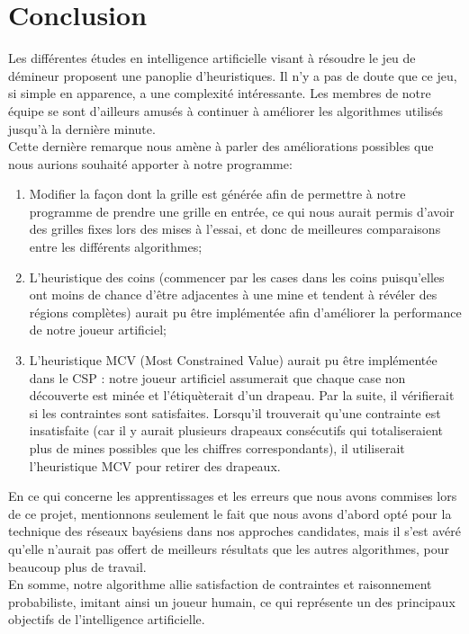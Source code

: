 \documentclass{article}
\begin{document}
\section{Conclusion}
Les différentes études en intelligence artificielle visant à résoudre le jeu de démineur 
proposent une panoplie d’heuristiques. Il n’y a pas de doute que ce jeu, si simple en apparence, 
a une complexité intéressante. Les membres de notre équipe se sont d’ailleurs amusés à continuer 
à améliorer les algorithmes utilisés jusqu’à la dernière minute. \\

Cette dernière remarque nous amène à parler des améliorations possibles que nous aurions souhaité apporter à notre programme:
\begin{enumerate}
        \item Modifier la façon dont la grille est générée afin de permettre à notre programme 
              de prendre une grille en entrée, ce qui nous aurait permis d’avoir des grilles fixes 
              lors des mises à l’essai, et donc de meilleures comparaisons entre les différents algorithmes;
        \item L’heuristique des coins (commencer par les cases dans les coins puisqu’elles ont 
              moins de chance d’être adjacentes à une mine et tendent à révéler des régions complètes) 
              aurait pu être implémentée afin d’améliorer la performance de notre joueur artificiel;
        \item L’heuristique MCV (Most Constrained Value) aurait pu être implémentée dans le CSP : notre joueur 
              artificiel assumerait que chaque case non découverte est minée et l’étiquèterait d’un drapeau. 
              Par la suite, il vérifierait si les contraintes sont satisfaites. Lorsqu’il trouverait qu’une 
              contrainte est insatisfaite (car il y aurait plusieurs drapeaux consécutifs qui totaliseraient 
              plus de mines possibles que les chiffres correspondants), il utiliserait l’heuristique MCV pour retirer des drapeaux.
\end{enumerate}

En ce qui concerne les apprentissages et les erreurs que nous avons commises lors de ce 
projet, mentionnons seulement le fait que nous avons d’abord opté pour la technique des 
réseaux bayésiens dans nos approches candidates, mais il s’est avéré qu’elle n’aurait pas
offert de meilleurs résultats que les autres algorithmes, pour beaucoup plus de travail. \\

En somme, notre algorithme allie satisfaction de contraintes et raisonnement probabiliste, imitant ainsi un joueur 
humain, ce qui représente un des principaux objectifs de l'intelligence artificielle.
\end{document}
